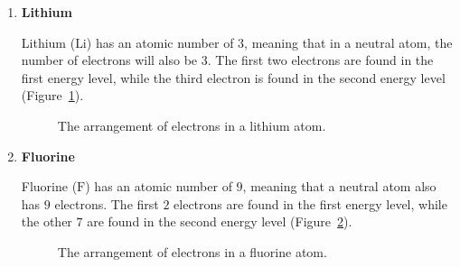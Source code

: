 \begin{enumerate}[noitemsep, label=\textbf{\arabic*}. ] 

\item{\textbf{Lithium} \\
\begin{minipage}{.4\textwidth}
Lithium ($\text{Li}$) has an atomic number of $3$, meaning that in a neutral atom, the number of electrons will also be $3$. The first two electrons are found in the first energy level, while the third electron is found in the second energy level (Figure~\ref{fig:atom:lithium}).
\end{minipage}
\begin{minipage}{.6\textwidth}
\begin{figure}[H]
\begin{center}
\caption{The arrangement of electrons in a lithium atom.}
\label{fig:atom:lithium}
\end{center}
\end{figure}
\end{minipage}
}

\item{\textbf{Fluorine} \\
\begin{minipage}{.4\textwidth}
Fluorine ($\text{F}$) has an atomic number of $9$, meaning that a neutral atom also has $9$ electrons. The first $2$ electrons are found in the first energy level, while the other $7$ are found in the second energy level (Figure~\ref{fig:atom:fluorine}).
\end{minipage}
\begin{minipage}{.6\textwidth}
\begin{figure}[H]
\begin{center}
\caption{The arrangement of electrons in a fluorine atom.}
\label{fig:atom:fluorine}
\end{center}
\end{figure}
\end{minipage}
}


\end{enumerate}
